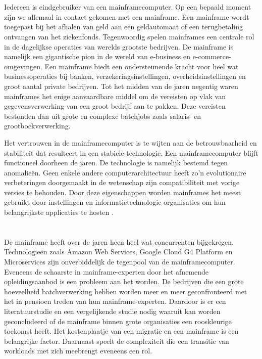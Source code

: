 \section{}

Iedereen is eindgebruiker van een mainframecomputer. Op een bepaald moment zijn we allemaal in contact gekomen met een mainframe. Een mainframe wordt toegepast bij het afhalen van geld aan een geldautomaat of een terugbetaling ontvangen van het ziekenfonds. Tegenwoordig spelen mainframes een centrale rol in de dagelijkse operaties van werelds grootste bedrijven. De mainframe is namelijk een gigantische pion in de wereld van e-business en e-commerce-omgevingen. Een mainframe biedt een ondersteunende kracht voor heel wat businessoperaties bij banken, verzekeringsinstellingen, overheidsinstellingen en groot aantal private bedrijven. Tot het midden van de jaren negentig waren mainframes het enige aanvaardbare middel om de vereisten op vlak van gegevensverwerking van een groot bedrijf aan te pakken. Deze vereisten bestonden dan uit grote en complexe batchjobs zoals salaris- en grootboekverwerking.

Het vertrouwen in de mainframecomputer is te wijten aan de betrouwbaarheid en stabiliteit dat resulteert in een stabiele technologie. Een mainframecomputer blijft functioneel doorheen de jaren. De technologie is namelijk bestemd tegen anomalieën. Geen enkele andere computerarchitectuur heeft zo'n evolutionaire verbeteringen doorgemaakt in de wetenschap zijn compatibiliteit met vorige versies te behouden. Door deze eigenschappen worden mainframes het meest gebruikt door instellingen en informatietechnologie organisaties om hun belangrijkste applicaties te hosten \autocite{Ebbers2022}. 


\section{}
\label{sec:probleemstelling}

De mainframe heeft over de jaren heen heel wat concurrenten bijgekregen. Technologieën zoals Amazon Web Services, Google Cloud G4 Platform en Microservices zijn onverbiddelijk de tegenpool van de mainframecomputer. Eveneens de schaarste in mainframe-experten door het afnemende opleidingsaanbod is een probleem aan het worden. De bedrijven die een grote hoeveelheid batchverwerking hebben worden meer en meer geconfronteerd met het in pensioen treden van hun mainframe-experten. Daardoor is er een literatuurstudie en een vergelijkende studie nodig waaruit kan worden geconcludeerd of de mainframe binnen grote organisaties een rooskleurige toekomst heeft. Het kostenplaatje van een migratie en een mainframe is een belangrijke factor. Daarnaast speelt de complexiteit die een transitie van workloads met zich meebrengt eveneens een rol. 


